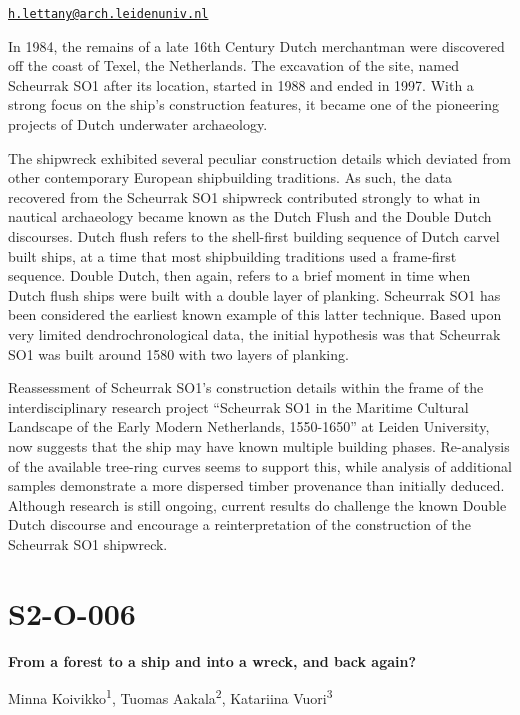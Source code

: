 \documentclass[
]{book}
\begin{document}
\href{mailto:h.lettany@arch.leidenuniv.nl}{\nolinkurl{h.lettany@arch.leidenuniv.nl}}

In 1984, the remains of a late 16th Century Dutch merchantman were discovered off the coast of Texel, the Netherlands. The excavation of the site, named Scheurrak SO1 after its location, started in 1988 and ended in 1997. With a strong focus on the ship's construction features, it became one of the pioneering projects of Dutch underwater archaeology.

The shipwreck exhibited several peculiar construction details which deviated from other contemporary European shipbuilding traditions. As such, the data recovered from the Scheurrak SO1 shipwreck contributed strongly to what in nautical archaeology became known as the Dutch Flush and the Double Dutch discourses. Dutch flush refers to the shell-first building sequence of Dutch carvel built ships, at a time that most shipbuilding traditions used a frame-first sequence. Double Dutch, then again, refers to a brief moment in time when Dutch flush ships were built with a double layer of planking. Scheurrak SO1 has been considered the earliest known example of this latter technique. Based upon very limited dendrochronological data, the initial hypothesis was that Scheurrak SO1 was built around 1580 with two layers of planking.

Reassessment of Scheurrak SO1's construction details within the frame of the interdisciplinary research project ``Scheurrak SO1 in the Maritime Cultural Landscape of the Early Modern Netherlands, 1550-1650'' at Leiden University, now suggests that the ship may have known multiple building phases. Re-analysis of the available tree-ring curves seems to support this, while analysis of additional samples demonstrate a more dispersed timber provenance than initially deduced. Although research is still ongoing, current results do challenge the known Double Dutch discourse and encourage a reinterpretation of the construction of the Scheurrak SO1 shipwreck.

\hypertarget{s2-o-006}{%
\section*{S2-O-006}\label{s2-o-006}}

\textbf{From a forest to a ship and into a wreck, and back again?}

Minna Koivikko\textsuperscript{1}, Tuomas Aakala\textsuperscript{2}, Katariina Vuori\textsuperscript{3}
\end{document}
